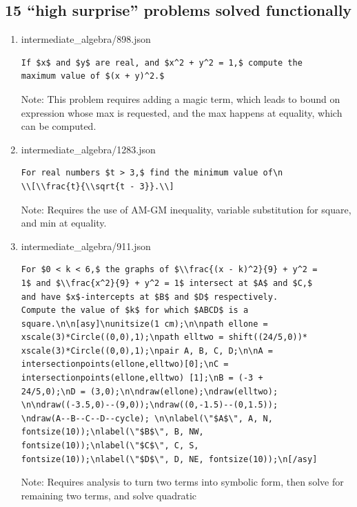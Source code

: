 \documentclass[11pt,a4paper]{article}
\begin{document}
\subsection{15 ``high surprise'' problems solved functionally}
\begin{enumerate}
  \item intermediate\_algebra/898.json
\begin{verbatim}
If $x$ and $y$ are real, and $x^2 + y^2 = 1,$ compute the
maximum value of $(x + y)^2.$
\end{verbatim}
    Note: This problem requires adding a magic term, which leads to bound on expression whose max is requested, and the max happens at equality, which can be computed.

  \item intermediate\_algebra/1283.json
\begin{verbatim}
For real numbers $t > 3,$ find the minimum value of\n
\\[\\frac{t}{\\sqrt{t - 3}}.\\]
\end{verbatim}
    Note: Requires the use of AM-GM inequality, variable substitution for square, and min at equality.

  \item intermediate\_algebra/911.json
\begin{verbatim}
For $0 < k < 6,$ the graphs of $\\frac{(x - k)^2}{9} + y^2 =
1$ and $\\frac{x^2}{9} + y^2 = 1$ intersect at $A$ and $C,$
and have $x$-intercepts at $B$ and $D$ respectively.
Compute the value of $k$ for which $ABCD$ is a
square.\n\n[asy]\nunitsize(1 cm);\n\npath ellone =
xscale(3)*Circle((0,0),1);\npath elltwo = shift((24/5,0))*
xscale(3)*Circle((0,0),1);\npair A, B, C, D;\n\nA =
intersectionpoints(ellone,elltwo)[0];\nC =
intersectionpoints(ellone,elltwo) [1];\nB = (-3 +
24/5,0);\nD = (3,0);\n\ndraw(ellone);\ndraw(elltwo);
\n\ndraw((-3.5,0)--(9,0));\ndraw((0,-1.5)--(0,1.5));
\ndraw(A--B--C--D--cycle); \n\nlabel(\"$A$\", A, N,
fontsize(10));\nlabel(\"$B$\", B, NW,
fontsize(10));\nlabel(\"$C$\", C, S,
fontsize(10));\nlabel(\"$D$\", D, NE, fontsize(10));\n[/asy]
\end{verbatim}
    Note: Requires analysis to turn two terms into symbolic form, then solve for remaining two terms, and solve quadratic


\end{enumerate}
\end{document}
